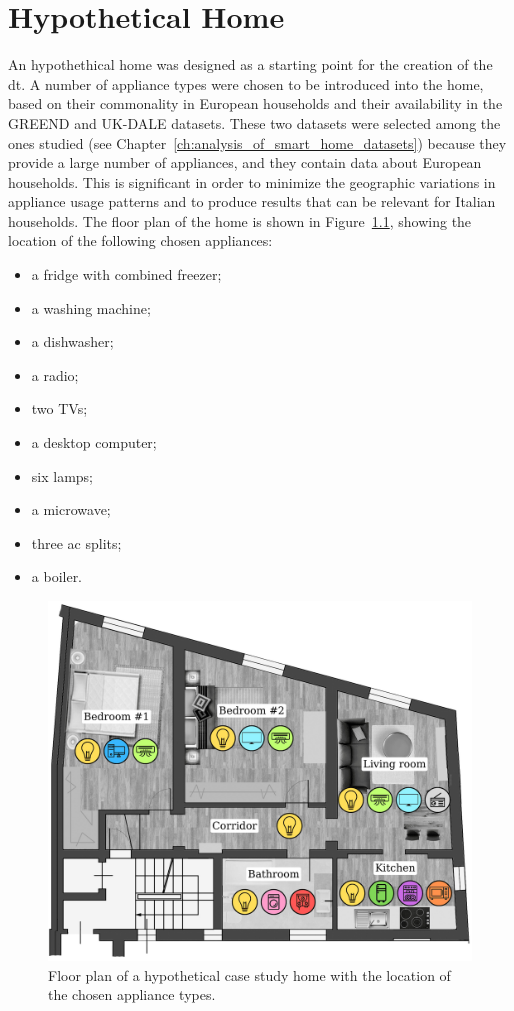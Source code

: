 \chapter{Hypothetical Home}\label{ch:hypothetical_home}

An hypothethical home was designed as a starting point for the creation of the \acrshort{dt}. A number of appliance types were chosen to be introduced into the home, based on their commonality in European households and their availability in the GREEND and UK-DALE datasets. These two datasets were selected among the ones studied (see Chapter~\ref{ch:analysis_of_smart_home_datasets}) because they provide a large number of appliances, and they contain data about European households. This is significant in order to minimize the geographic variations in appliance usage patterns and to produce results that can be relevant for Italian households. The floor plan of the home is shown in Figure~\ref{fig:home_floor_plan}, showing the location of the following chosen appliances:
\begin{itemize}
  \item a fridge with combined freezer;
  \item a washing machine;
  \item a dishwasher;
  \item a radio;
  \item two TVs;
  \item a desktop computer;
  \item six lamps;
  \item a microwave;
  \item three \acrshort{ac} splits;
  \item a boiler.
\end{itemize}

\begin{figure}
  \centering
  \includegraphics[width=0.75\linewidth]{images/floor_plan.png}
  \caption[Floor plan of a hypothetical case study home with the location of the chosen appliance types.]{Floor plan of a hypothetical case study home with the location of the chosen appliance types.}
  \label{fig:home_floor_plan}
\end{figure}

